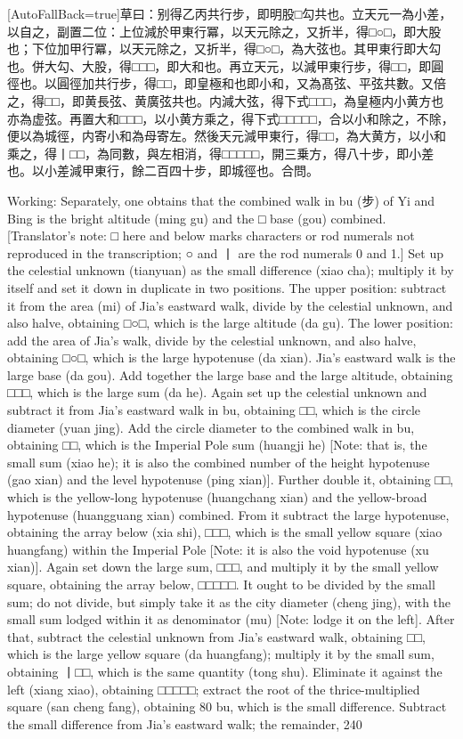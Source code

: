 \documentclass[11pt]{article}
\newcommand{\zhsmall}{\footnotesize\color{black!70}}
\newcommand{\unitlabel}[1]{\marginpar{\raggedleft\tiny\color{gray}#1}}
\newenvironment{unitzh}{\par\CJKfontspec{Noto Serif CJK SC}[AutoFallBack=true]\large\linespread{1.25}\selectfont}{\par}
\newenvironment{uniten}{\par\small\color{black!85}}{\par\medskip}
\begin{document}
\begin{unitzh}\unitlabel{ceyuan-019.1}草曰：别得乙丙共行步，即明股□勾共也。立天元一為小差，以自之，副置二位：上位減於甲東行冪，以天元除之，又折半，得□○□，即大股也；下位加甲行冪，以天元除之，又折半，得□○□，為大弦也。其甲東行即大勾也。併大勾、大股，得□□□，即大和也。再立天元，以減甲東行步，得□□，即圓徑也。以圓徑加共行步，得□□，即皇極和也{\zhsmall 即小和，又為髙弦、平弦共數}。又倍之，得□□，即黄長弦、黄廣弦共也。内減大弦，得下式□□□，為皇極内小黄方也{\zhsmall 亦為虚弦}。再置大和□□□，以小黄方乘之，得下式□□□□□，合以小和除之，不除，便以為城徑，内寄小和為母{\zhsmall 寄左}。然後天元減甲東行，得□□，為大黄方，以小和乘之，得丨□□，為同數，與左相消，得□□□□□，開三乗方，得八十步，即小差也。以小差減甲東行，餘二百四十步，即城徑也。合問。\end{unitzh}
\begin{uniten}Working: Separately, one obtains that the combined walk in bu (步) of Yi and Bing is the bright altitude (ming gu) and the □ base (gou) combined. [Translator's note: □ here and below marks characters or rod numerals not reproduced in the transcription; ○ and 丨 are the rod numerals 0 and 1.] Set up the celestial unknown (tianyuan) as the small difference (xiao cha); multiply it by itself and set it down in duplicate in two positions. The upper position: subtract it from the area (mi) of Jia's eastward walk, divide by the celestial unknown, and also halve, obtaining □○□, which is the large altitude (da gu). The lower position: add the area of Jia's walk, divide by the celestial unknown, and also halve, obtaining □○□, which is the large hypotenuse (da xian). Jia's eastward walk is the large base (da gou). Add together the large base and the large altitude, obtaining □□□, which is the large sum (da he). Again set up the celestial unknown and subtract it from Jia's eastward walk in bu, obtaining □□, which is the circle diameter (yuan jing). Add the circle diameter to the combined walk in bu, obtaining □□, which is the Imperial Pole sum (huangji he) [Note: that is, the small sum (xiao he); it is also the combined number of the height hypotenuse (gao xian) and the level hypotenuse (ping xian)]. Further double it, obtaining □□, which is the yellow-long hypotenuse (huangchang xian) and the yellow-broad hypotenuse (huangguang xian) combined. From it subtract the large hypotenuse, obtaining the array below (xia shi), □□□, which is the small yellow square (xiao huangfang) within the Imperial Pole [Note: it is also the void hypotenuse (xu xian)]. Again set down the large sum, □□□, and multiply it by the small yellow square, obtaining the array below, □□□□□. It ought to be divided by the small sum; do not divide, but simply take it as the city diameter (cheng jing), with the small sum lodged within it as denominator (mu) [Note: lodge it on the left]. After that, subtract the celestial unknown from Jia's eastward walk, obtaining □□, which is the large yellow square (da huangfang); multiply it by the small sum, obtaining 丨□□, which is the same quantity (tong shu). Eliminate it against the left (xiang xiao), obtaining □□□□□; extract the root of the thrice-multiplied square (san cheng fang), obtaining 80 bu, which is the small difference. Subtract the small difference from Jia's eastward walk; the remainder, 240 
\end{document}
